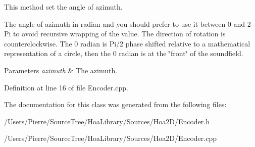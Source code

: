 This method set the angle of azimuth. 

The angle of azimuth in radian and you should prefer to use it between 0 and 2 Pi to avoid recursive wrapping of the value. The direction of rotation is counterclockwise. The 0 radian is Pi/2 phase shifted relative to a mathematical representation of a circle, then the 0 radian is at the \char`\"{}front\char`\"{} of the soundfield.


\begin{DoxyParams}{Parameters}
{\em azimuth} & The azimuth. \\
\hline
\end{DoxyParams}


Definition at line 16 of file Encoder.\-cpp.



The documentation for this class was generated from the following files\-:\begin{DoxyCompactItemize}
\item 
/\-Users/\-Pierre/\-Source\-Tree/\-Hoa\-Library/\-Sources/\-Hoa2\-D/Encoder.\-h\item 
/\-Users/\-Pierre/\-Source\-Tree/\-Hoa\-Library/\-Sources/\-Hoa2\-D/Encoder.\-cpp\end{DoxyCompactItemize}
